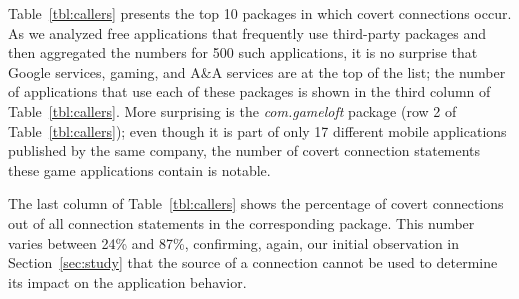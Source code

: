 Table~\ref{tbl:callers} presents the top 10 packages in which
covert connections occur. 
As we analyzed free applications that frequently use third-party packages and then aggregated the numbers for
500 such applications, it is no surprise that Google services, gaming, and A\&A services are at the top of the
list; the number of applications that use each of these packages is shown in the third
column of Table~\ref{tbl:callers}.
More surprising is the \emph{com.gameloft} package (row 2 of Table~\ref{tbl:callers}); even though it is part of only 17 different mobile applications published by the same company, the number of covert connection statements these game applications contain is notable. 

The last column of Table~\ref{tbl:callers} shows the percentage of covert connections out of all connection statements in the corresponding package. This number varies between 24\% and 87\%, confirming, again, our initial observation in Section~\ref{sec:study} that the source of a connection cannot be used to determine its impact on the application behavior. 


 






